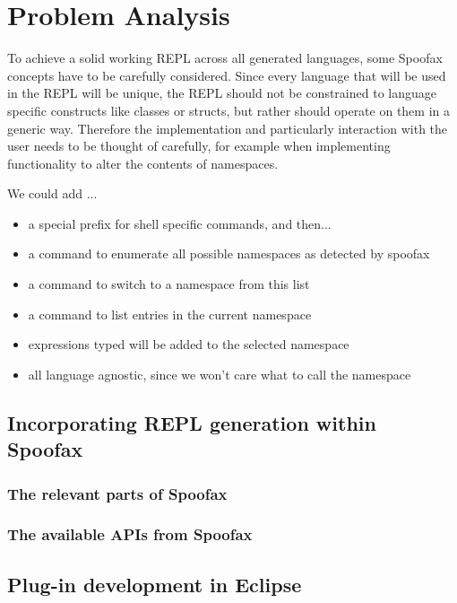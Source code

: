 \section{Problem Analysis}
\label{sec:problem-analysis}

To achieve a solid working REPL across all generated languages,
some Spoofax concepts have to be carefully considered.
Since every language that will be used in the REPL will be unique,
the REPL should not be constrained to language specific constructs like
classes or structs, but rather should operate on them in a generic way.
Therefore the implementation and particularly interaction with the user needs
to be thought of carefully, for example when implementing functionality to
alter the contents of namespaces.

We could add ...
\begin{itemize}
\item a special prefix for shell specific commands, and then...
\item a command to enumerate all possible namespaces as detected by spoofax
\item a command to switch to a namespace from this list
\item a command to list entries in the current namespace
\item expressions typed will be added to the selected namespace
\item all language agnostic, since we won't care what to call the namespace
\end{itemize}

\subsection{Incorporating REPL generation within Spoofax}
\label{ssec:architecture}

\subsubsection{The relevant parts of Spoofax}
\label{sec:which-parts-spoofax}

\subsubsection{The available APIs from Spoofax}
\label{sec:what-are-available}

\subsection{Plug-in development in Eclipse}
\label{ssec:eclipse-plugins}

